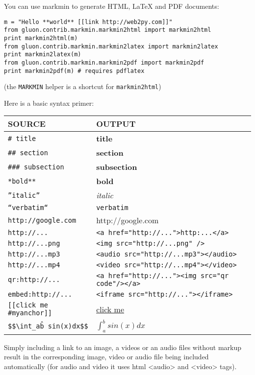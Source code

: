 \documentclass[justified,sixbynine,notoc]{tufte-book}
\def\ft{\small\tt}
\begin{document}
\begin{fullwidth}
You can use markmin to generate HTML, LaTeX and PDF documents:

\begin{lstlisting}
m = "Hello **world** [[link http://web2py.com]]"
from gluon.contrib.markmin.markmin2html import markmin2html
print markmin2html(m)
from gluon.contrib.markmin.markmin2latex import markmin2latex
print markmin2latex(m)
from gluon.contrib.markmin.markmin2pdf import markmin2pdf
print markmin2pdf(m) # requires pdflatex
\end{lstlisting}

(the {\ft MARKMIN} helper is a shortcut for {\ft markmin2html})

Here is a basic syntax primer:

\goodbreak\begin{center}
{\begin{tabular}{ll}\hline
{\bf SOURCE}                 & {\bf OUTPUT}\\ \hline
{\ft \# title}                & {\bf title}\\
{\ft \#\# section}             & {\bf section}\\
{\ft \#\#\# subsection}         & {\bf subsection}\\
{\ft **bold**}               & {\bf bold}\\
{\ft ''italic''}             & {\it italic}\\
{\ft ``verbatim``}       & {\ft verbatim}\\
{\ft http://google.com}      & http://google.com\\
{\ft http://...} & {\ft <a href="http://...">http:...</a>}\\
{\ft http://...png} & {\ft <img src="http://...png" />}\\
{\ft http://...mp3} & {\ft <audio src="http://...mp3"></audio>}\\
{\ft http://...mp4} & {\ft <video src="http://...mp4"></video>}\\
{\ft qr:http://...} & {\ft <a href="http://..."><img src="qr code"/></a>}\\
{\ft embed:http://...} & {\ft <iframe src="http://..."></iframe>}\\
{\ft [[click me \#myanchor]]} & {\footnotesize\href{\#myanchor}{click me}}\\
{\ft \$}{\ft \${\textbackslash}int\_a\^b sin(x)dx\$}{\ft \$}  & $\int_a^b sin(x)dx$ \\ \hline
\end{tabular}}
\end{center}
Simply including a link to an image, a videos or an audio files without markup result in the corresponding image, video or audio file being included automatically (for audio and video it uses html <audio> and <video> tags).


\end{fullwidth}
\end{document}

